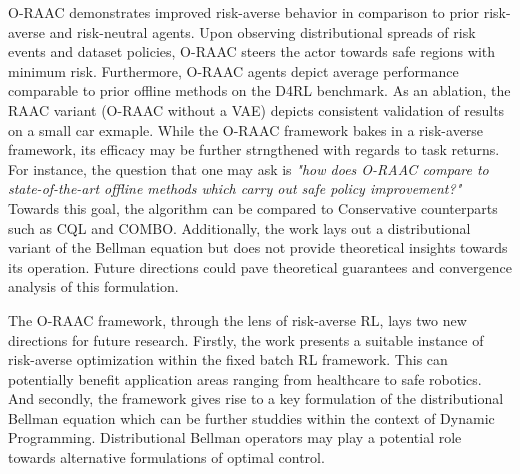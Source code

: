 \documentclass[11pt,letterpaper]{article}
\begin{document}
O-RAAC demonstrates improved risk-averse behavior in comparison to prior risk-averse and risk-neutral agents. Upon observing distributional spreads of risk events and dataset policies, O-RAAC steers the actor towards safe regions with minimum risk. Furthermore, O-RAAC agents depict average performance comparable to prior offline methods on the D4RL benchmark. As an ablation, the RAAC variant (O-RAAC without a VAE) depicts consistent validation of results on a small car exmaple. While the O-RAAC framework bakes in a risk-averse framework, its efficacy may be further strngthened with regards to task returns. For instance, the question that one may ask is \textit{"how does O-RAAC compare to state-of-the-art offline methods which carry out safe policy improvement?"} Towards this goal, the algorithm can be compared to Conservative counterparts such as CQL and COMBO. Additionally, the work lays out a distributional variant of the Bellman equation but does not provide theoretical insights towards its operation. Future directions could pave theoretical guarantees and convergence analysis of this formulation.

The O-RAAC framework, through the lens of risk-averse RL, lays two new directions for future research. Firstly, the work presents a suitable instance of risk-averse optimization within the fixed batch RL framework. This can potentially benefit application areas ranging from healthcare to safe robotics. And secondly, the framework gives rise to a key formulation of the distributional Bellman equation which can be further studdies within the context of Dynamic Programming. Distributional Bellman operators may play a potential role towards alternative formulations of optimal control.
\end{document}
